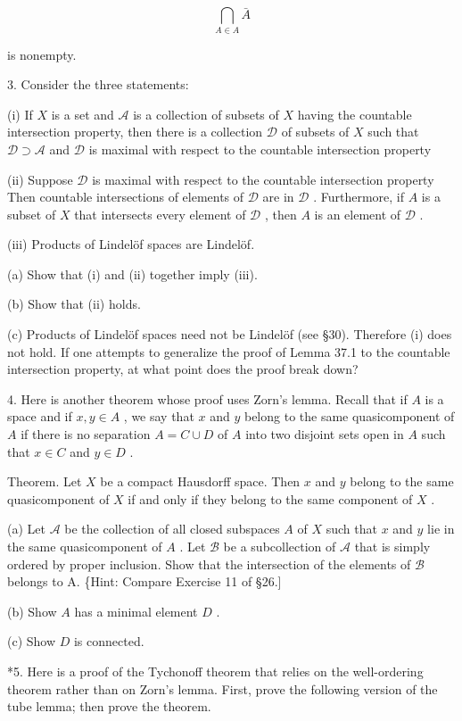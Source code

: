 \documentclass[10pt]{article}
\begin{document}
\[
\mathop{\bigcap }\limits_{{A \in  A}}\bar{A}
\]

is nonempty.

3. Consider the three statements:

(i) If \(X\) is a set and \(\mathcal{A}\) is a collection of subsets of \(X\) having the countable intersection property, then there is a collection \(\mathcal{D}\) of subsets of \(X\) such that \(\mathcal{D} \supset  \mathcal{A}\) and \(\mathcal{D}\) is maximal with respect to the countable intersection property

(ii) Suppose \(\mathcal{D}\) is maximal with respect to the countable intersection property Then countable intersections of elements of \(\mathcal{D}\) are in \(\mathcal{D}\) . Furthermore, if \(A\) is a subset of \(X\) that intersects every element of \(\mathcal{D}\) , then \(A\) is an element of \(\mathcal{D}\) .

(iii) Products of Lindelöf spaces are Lindelöf.

(a) Show that (i) and (ii) together imply (iii).

(b) Show that (ii) holds.

(c) Products of Lindelöf spaces need not be Lindelöf (see §30). Therefore (i) does not hold. If one attempts to generalize the proof of Lemma 37.1 to the countable intersection property, at what point does the proof break down?

4. Here is another theorem whose proof uses Zorn’s lemma. Recall that if \(A\) is a space and if \(x,y \in  A\) , we say that \(x\) and \(y\) belong to the same quasicomponent of \(A\) if there is no separation \(A = C \cup  D\) of \(A\) into two disjoint sets open in \(A\) such that \(x \in  C\) and \(y \in  D\) .

Theorem. Let \(X\) be a compact Hausdorff space. Then \(x\) and \(y\) belong to the same quasicomponent of \(X\) if and only if they belong to the same component of \(X\) .

(a) Let \(\mathcal{A}\) be the collection of all closed subspaces \(A\) of \(X\) such that \(x\) and \(y\) lie in the same quasicomponent of \(A\) . Let \(\mathcal{B}\) be a subcollection of \(\mathcal{A}\) that is simply ordered by proper inclusion. Show that the intersection of the elements of \(\mathcal{B}\) belongs to A. \{Hint: Compare Exercise 11 of §26.]

(b) Show \(A\) has a minimal element \(D\) .

(c) Show \(D\) is connected.

*5. Here is a proof of the Tychonoff theorem that relies on the well-ordering theorem rather than on Zorn's lemma. First, prove the following version of the tube lemma; then prove the theorem.
\end{document}
